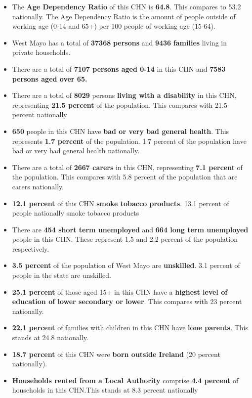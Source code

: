\documentclass{article}
\begin{document}
\begin{itemize}

\item The \textbf{Age Dependency Ratio} of this CHN is  \textbf{64.8}. This compares to 53.2 nationally. The Age Dependency Ratio is the amount of people outside of working age (0-14 and 65+) per 100 people of working age (15-64). 

\item West Mayo has a total of \textbf{\num{37368}} \textbf{persons} and  \textbf{\num{9436}} \textbf{families} living in private households.

\item There are a total of \textbf{\num{7107} persons aged 0-14} in this CHN and \textbf{\num{7583} persons aged over 65.} 

\item There are a total of \textbf{\num{8029}} persons \textbf{living with a disability} in this CHN, representing \textbf{21.5 percent} of the population. This compares with  21.5 percent nationally

\item \textbf{\num{650}} people in this CHN have \textbf{bad or very bad general health}. This represents \textbf{1.7 percent} of the population. 1.7 percent of the population have bad or very bad general health nationally. 

\item There are a total of \textbf{\num{2667} carers} in this CHN, representing \textbf{7.1 percent} of the population. This compares with 5.8 percent of the population that are carers nationally. 

\item \textbf{12.1 percent} of this CHN \textbf{smoke tobacco products}. 13.1 percent of people nationally smoke tobacco products

\item There are \textbf{\num{454} short term unemployed} and \textbf{\num{664} long term unemployed} people in this CHN. These represent 1.5 and 2.2 percent of the population respectively.

\item  \textbf{3.5 percent} of the population of West Mayo are \textbf{unskilled}. 3.1 percent of people in the state are unskilled.

\item \textbf{25.1 percent} of those aged 15+ in this CHN have a \textbf{highest level of education of lower secondary or lower}. This compares with 23 percent nationally. 

\item \textbf{22.1 percent} of families with children in this CHN have \textbf{lone parents}. This stands at 24.8 nationally.

\item \textbf{18.7 percent} of this CHN were \textbf{born outside Ireland} (20 percent nationally).

\item \textbf{Households rented from a Local Authority} comprise \textbf{4.4 percent} of households in this CHN.This stands at 8.3 percent nationally

\end{itemize}
\end{document}
